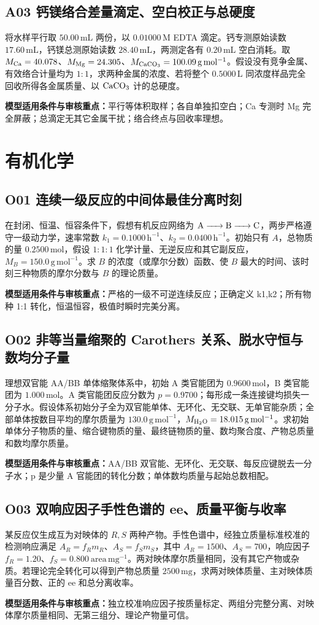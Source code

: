 \documentclass[UTF8,openany,11pt,a4paper]{ctexbook}
\newcommand{\sciencewarn}[1]{\begin{reviewnote}\textbf{\textcolor{warn}{模型适用条件与审核重点：}}#1\end{reviewnote}}
\begin{document}
\section{A03 \quad 钙镁络合差量滴定、空白校正与总硬度}
将水样平行取 \(50.00\,\mathrm{mL}\) 两份，以 \(0.01000\,\mathrm M\) EDTA 滴定。钙专测原始读数 \(17.60\,\mathrm{mL}\)，钙镁总测原始读数 \(28.40\,\mathrm{mL}\)，两测定各有 \(0.20\,\mathrm{mL}\) 空白消耗。取 \(M_{\rm Ca}=40.078\)、\(M_{\rm Mg}=24.305\)、\(M_{\ce{CaCO3}}=100.09\,\mathrm{g\,mol^{-1}}\)。假设没有竞争金属、有效络合计量均为 \(1:1\)，求两种金属的浓度、若将整个 \(0.5000\,\mathrm L\) 同浓度样品完全回收所得各金属质量、以 \(\ce{CaCO3}\) 计的总硬度。
\sciencewarn{平行等体积取样；各自单独扣空白；Ca 专测时 Mg 完全屏蔽；总滴定无其它金属干扰；络合终点与回收率理想。}
\chapter{有机化学}
\section{O01 \quad 连续一级反应的中间体最佳分离时刻}
在封闭、恒温、恒容条件下，假想有机反应网络为 \(\ce{A -> B -> C}\)，两步严格遵守一级动力学，速率常数 \(k_1=0.1000\,\mathrm{h^{-1}}\)、\(k_2=0.0400\,\mathrm{h^{-1}}\)。初始只有 \(A\)，总物质的量 \(0.2500\,\mathrm{mol}\)，假设 \(1:1:1\) 化学计量、无逆反应和其它副反应，\(M_B=150.0\,\mathrm{g\,mol^{-1}}\)。求 \(B\) 的浓度（或摩尔分数）函数、使 \(B\) 最大的时间、该时刻三种物质的摩尔分数与 \(B\) 的理论质量。
\sciencewarn{严格的一级不可逆连续反应；正确定义 k1,k2；所有物种 1:1 转化，恒温恒容，极值时瞬时完美分离。}
\section{O02 \quad 非等当量缩聚的 Carothers 关系、脱水守恒与数均分子量}
理想双官能 AA/BB 单体缩聚体系中，初始 A 类官能团为 \(0.9600\,\mathrm{mol}\)，B 类官能团为 \(1.000\,\mathrm{mol}\)。A 类官能团反应分数为 \(p=0.9700\)；每形成一条连接键均损失一分子水。假设体系初始分子全为双官能单体、无环化、无交联、无单官能杂质；全部单体按数目平均的摩尔质量为 \(130.0\,\mathrm{g\,mol^{-1}}\)，\(M_{\ce{H2O}}=18.015\,\mathrm{g\,mol^{-1}}\)。求初始单体分子物质的量、缩合键物质的量、最终链物质的量、数均聚合度、产物总质量和数均摩尔质量。
\sciencewarn{AA/BB 双官能、无环化、无交联、每反应键脱去一分子水；p 是少量 A 官能团的转化分数；单体数均质量与起始总数相配。}
\section{O03 \quad 双响应因子手性色谱的 ee、质量平衡与收率}
某反应仅生成互为对映体的 \(R,S\) 两种产物。手性色谱中，经独立质量标准校准的检测响应满足 \(A_R=f_Rm_R\)、\(A_S=f_Sm_S\)，其中 \(A_R=1500\)、\(A_S=700\)，响应因子 \(f_R=1.20\)、\(f_S=0.800\ \mathrm{area\,mg^{-1}}\)。两对映体摩尔质量相同，没有其它产物或杂质。若理论完全转化可以得到产物总质量 \(2500\,\mathrm{mg}\)，求两对映体质量、主对映体质量百分数、正的 ee 和总分离收率。
\sciencewarn{独立校准响应因子按质量标定、两组分完整分离、对映体摩尔质量相同、无第三组分、理论产物量可信。}
\end{document}
